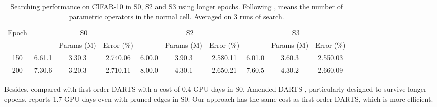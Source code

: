 \documentclass{article} \usepackage{iclr2021_conference,times}
\begin{document}
\begin{table}[ht]
	\setlength{\tabcolsep}{1pt}
	\caption{Searching performance on CIFAR-10 in S0, S2 and S3 using longer epochs. Following \cite{bi2019stabilizing},  means the number of parametric operators in the normal cell. Averaged on 3 runs of search.}
	\smallskip
	\centering
	\smallskip\begin{tabular}{c|*{3}{c}|*{3}{c}|*{3}{c}}
		\toprule
		Epoch  &  \multicolumn{3}{c|}{S0} & \multicolumn{3}{c|}{S2} & \multicolumn{3}{c}{S3} \\
		 &  & \small{Params (M)} & \small{Error (\%)} &  & \small{Params (M)} & \small{Error (\%)} &    & \small{Params (M)} & \small{Error (\%)} \\
		\midrule
		150 & 6.61.1 & 3.30.3& 2.740.06 & 6.00.0 & 3.90.3 & 2.580.11 & 6.01.0 & 3.60.3 & 2.550.03 \\
		200 & 7.30.6 & 3.20.3 & 2.710.11 &  8.00.0 & 4.30.1 & 2.650.21 & 7.60.5 & 4.30.2 & 2.660.09 \\
		\bottomrule
	\end{tabular}
	\label{tab:long_epoch_search}
\end{table}

Besides, compared with first-order DARTS with a cost of 0.4 GPU days in S0, Amended-DARTS \citep{bi2019stabilizing}, particularly designed to survive longer epochs, reports 1.7 GPU days even with pruned edges in S0. Our approach has the same cost as first-order DARTS, which is more efficient.
\end{document}
